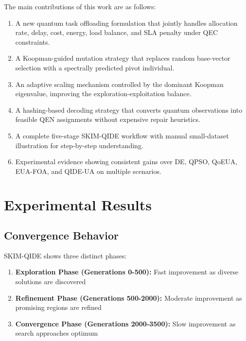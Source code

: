 \documentclass[12pt,a4paper]{article}
\begin{document}
The main contributions of this work are as follows:

\begin{enumerate}[leftmargin=*,itemsep=2pt]
    \item A new quantum task offloading formulation that jointly handles allocation rate, delay, cost, energy, load balance, and SLA penalty under QEC constraints.
    \item A Koopman-guided mutation strategy that replaces random base-vector selection with a spectrally predicted pivot individual.
    \item An adaptive scaling mechanism controlled by the dominant Koopman eigenvalue, improving the exploration-exploitation balance.
    \item A hashing-based decoding strategy that converts quantum observations into feasible QEN assignments without expensive repair heuristics.
    \item A complete five-stage SKIM-QIDE workflow with manual small-dataset illustration for step-by-step understanding.
    \item Experimental evidence showing consistent gains over DE, QPSO, QoEUA, EUA-FOA, and QIDE-UA on multiple scenarios.
\end{enumerate}

\section{Experimental Results}

\subsection{Convergence Behavior}

SKIM-QIDE shows three distinct phases:

\begin{enumerate}
  \item \textbf{Exploration Phase (Generations 0-500):} Fast improvement as diverse solutions are discovered
  \item \textbf{Refinement Phase (Generations 500-2000):} Moderate improvement as promising regions are refined
  \item \textbf{Convergence Phase (Generations 2000-3500):} Slow improvement as search approaches optimum
\end{enumerate}
\end{document}
